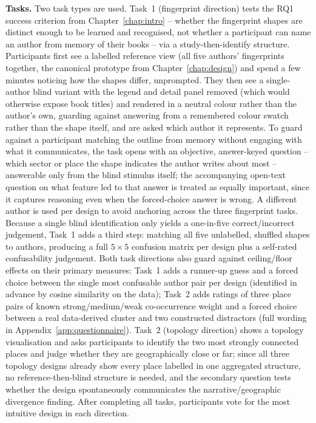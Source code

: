 \documentclass[logo,msc]{infthesis}
\begin{document}
\textbf{Tasks.} Two task types are used. Task~1 (fingerprint direction) tests the RQ1 success criterion from Chapter~\ref{chap:intro} -- whether the fingerprint shapes are distinct enough to be learned and recognised, not whether a participant can name an author from memory of their books -- via a study-then-identify structure. Participants first see a labelled reference view (all five authors' fingerprints together, the canonical prototype from Chapter~\ref{chap:design}) and spend a few minutes noticing how the shapes differ, unprompted. They then see a single-author blind variant with the legend and detail panel removed (which would otherwise expose book titles) and rendered in a neutral colour rather than the author's own, guarding against answering from a remembered colour swatch rather than the shape itself, and are asked which author it represents. To guard against a participant matching the outline from memory without engaging with what it communicates, the task opens with an objective, answer-keyed question -- which sector or place the shape indicates the author writes about most -- answerable only from the blind stimulus itself; the accompanying open-text question on what feature led to that answer is treated as equally important, since it captures reasoning even when the forced-choice answer is wrong. A different author is used per design to avoid anchoring across the three fingerprint tasks. Because a single blind identification only yields a one-in-five correct/incorrect judgement, Task~1 adds a third step: matching all five unlabelled, shuffled shapes to authors, producing a full $5\times5$ confusion matrix per design plus a self-rated confusability judgement. Both task directions also guard against ceiling/floor effects on their primary measures: Task~1 adds a runner-up guess and a forced choice between the single most confusable author pair per design (identified in advance by cosine similarity on the data); Task~2 adds ratings of three place pairs of known strong/medium/weak co-occurrence weight and a forced choice between a real data-derived cluster and two constructed distractors (full wording in Appendix~\ref{app:questionnaire}). Task~2 (topology direction) shows a topology visualisation and asks participants to identify the two most strongly connected places and judge whether they are geographically close or far; since all three topology designs already show every place labelled in one aggregated structure, no reference-then-blind structure is needed, and the secondary question tests whether the design spontaneously communicates the narrative/geographic divergence finding. After completing all tasks, participants vote for the most intuitive design in each direction.
 
\end{document}

